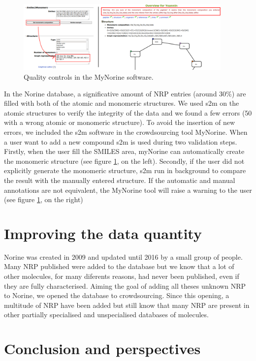 \documentclass[long, final]{jobim2017}
\begin{document}
 \begin{figure}
   \begin{center}
     \includegraphics[width=400px]{figs/warnings.png}
   \end{center}
   \caption{Quality controls in the MyNorine software.}
   \label{fig:warnings}
 \end{figure}

In the Norine database, a significative amount of NRP entries (around 30\%) are filled with both of the atomic and monomeric structures.
We used s2m on the atomic structures to verify the integrity of the data and we found a few errors (50 with a wrong atomic or monomeric structure).
To avoid the insertion of new errors, we included the s2m software in the crowdsourcing tool MyNorine.
When a user want to add a new compound s2m is used during two validation steps.
Firstly, when the user fill the SMILES area, myNorine can automatically create the monomeric structure (see figure \ref{fig:warnings}, on the left).
Secondly, if the user did not explicitly generate the monomeric structure, s2m run in background to compare the result with the manually entered structure.
If the automatic and manual annotations are not equivalent, the MyNorine tool will raise a warning to the user (see figure \ref{fig:warnings}, on the right)


\section{Improving the data quantity}

Norine was created in 2009 and updated until 2016 by a small group of people.
Many NRP published were added to the database but we know that a lot of other molecules, for many diferents reasons, had never been published, even if they are fully characterised.
Aiming the goal of adding all theses unknown NRP to Norine, we opened the database to crowdsourcing.
Since this opening, a multitude of NRP have been added but still know that many NRP are present in other partially specialised and unspecialised databases of molecules.


\section{Conclusion and perspectives}



 
 
\end{document}
